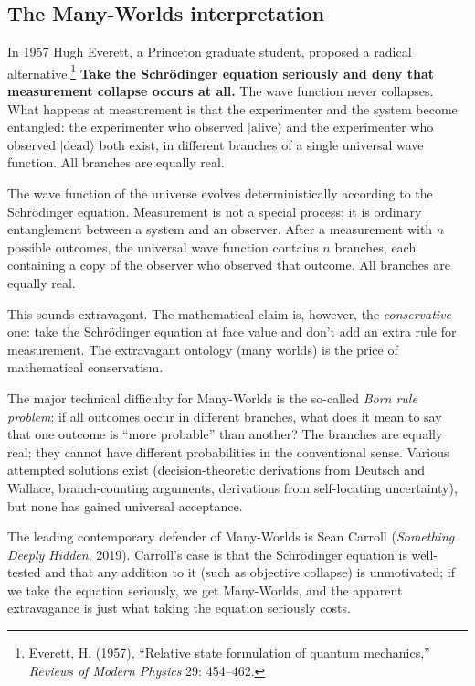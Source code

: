 \subsection{The Many-Worlds interpretation}

In 1957 Hugh Everett, a Princeton graduate student, proposed a
radical alternative.\footnote{Everett, H. (1957), ``Relative state
formulation of quantum mechanics,'' \emph{Reviews of Modern Physics}
29: 454--462.} \textbf{Take the Schr\"odinger equation seriously and
deny that measurement collapse occurs at all.} The wave function
never collapses. What happens at measurement is that the experimenter
and the system become entangled: the experimenter who observed
$|\text{alive}\rangle$ and the experimenter who observed
$|\text{dead}\rangle$ both exist, in different branches of a single
universal wave function. All branches are equally real.

\begin{principlebox}
The wave function of the universe evolves deterministically
according to the Schr\"odinger equation. Measurement is not a
special process; it is ordinary entanglement between a system and
an observer. After a measurement with $n$ possible outcomes, the
universal wave function contains $n$ branches, each containing a
copy of the observer who observed that outcome. All branches are
equally real.
\end{principlebox}

This sounds extravagant. The mathematical claim is, however, the
\emph{conservative} one: take the Schr\"odinger equation at face
value and don't add an extra rule for measurement. The extravagant
ontology (many worlds) is the price of mathematical conservatism.

The major technical difficulty for Many-Worlds is the so-called
\emph{Born rule problem}: if all outcomes occur in different
branches, what does it mean to say that one outcome is ``more
probable'' than another? The branches are equally real; they cannot
have different probabilities in the conventional sense. Various
attempted solutions exist (decision-theoretic derivations from
Deutsch and Wallace, branch-counting arguments, derivations from
self-locating uncertainty), but none has gained universal
acceptance.

The leading contemporary defender of Many-Worlds is Sean Carroll
(\emph{Something Deeply Hidden}, 2019). Carroll's case is that the
Schr\"odinger equation is well-tested and that any addition to it
(such as objective collapse) is unmotivated; if we take the equation
seriously, we get Many-Worlds, and the apparent extravagance is
just what taking the equation seriously costs.

